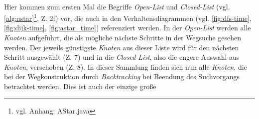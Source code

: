 \documentclass[12pt]{article}
\begin{document}
\\
Hier kommen zum ersten Mal die Begriffe \textit{Open-List} und \textit{Closed-List} (vgl. \autoref{alg:astar}\footnote{vgl. Anhang: AStar.java}, Z. 2f) vor, die auch in den Verhaltensdiagrammen (vgl. \autoref{fig:dfs-time}, \ref{fig:dijk-time}, \ref{fig:astar_time}) referenziert werden. In der \textit{Open-List} werden alle \textit{Knoten} aufgeführt, die als mögliche nächste Schritte in der Wegsuche gesehen werden. Der jeweils günstigste \textit{Knoten} aus dieser Liste wird für den nächsten Schritt ausgewählt (Z. 7) und in die \textit{Closed-List}, also die engere Auswahl aus \textit{Knoten}, verschoben (Z. 8). In dieser Sammlung finden sich nun alle \textit{Knoten}, die bei der Wegkonstruktion durch \textit{Backtracking} bei Beendung des Suchvorgangs betrachtet werden. Dies ist auch der einzige große 
\end{document}

